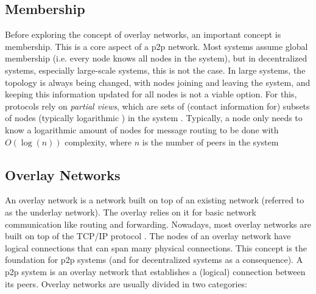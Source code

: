 \subsection{Membership}
\label{ssec:membership}
\par Before exploring the concept of overlay networks, an important concept is membership. This is a core aspect of a \gls{p2p} network. Most systems assume global membership (i.e. every node knows all nodes in the system), but in decentralized systems, especially large-scale systems, this is not the case. In large systems, the topology is always being changed, with nodes joining and leaving the system, and keeping this information updated for all nodes is not a viable option. For this, protocols rely on \textit{partial views}, which are sets of (contact information for) subsets of nodes (typically logarithmic \cite{Leitao2010}) in the system \cite{Leitao2007}. Typically, a node only needs to know a logarithmic amount of nodes for message routing to be done with $O(\log(n))$ complexity, %
where $n$ is the number of peers in the system \cite{Rowstron2001}
\subsection{Overlay Networks}
\label{ssec:overlay_networks}
\par An overlay network is a network built on top of an existing network (referred to as the underlay network). The overlay relies on it for basic network communication like routing and forwarding. Nowadays, most overlay networks are built on top of the TCP/IP protocol \cite{Tarkoma2010}. The nodes of an overlay network have logical connections that can span many physical connections. This concept is the foundation for \gls{p2p} systems (and for decentralized systems as a consequence). A \gls{p2p} system is an overlay network that establishes a (logical) connection between its peers. Overlay networks are usually divided in two categories:
%
%
%
